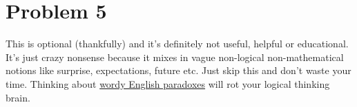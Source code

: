 \documentclass[14pt]{extarticle}
\begin{document}
\section{Problem 5}
This is optional (thankfully) and it's definitely not useful, helpful or educational. It's just crazy nonsense because it mixes in vague non-logical non-mathematical notions like surprise, expectations, future etc. Just skip this and don't waste your time. Thinking about \href{https://en.wikipedia.org/wiki/Unexpected_hanging_paradox}{wordy English paradoxes} will rot your logical thinking brain. 
\end{document}
